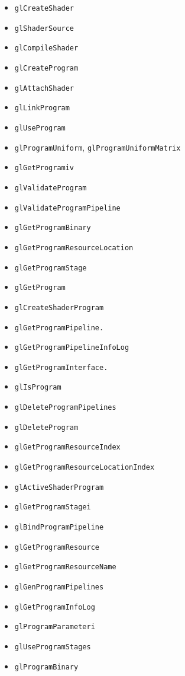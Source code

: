 \documentclass[12pt]{article}
\begin{document}
\begin{itemize}
\item \texttt{glCreateShader}
\item \texttt{glShaderSource}
\item \texttt{glCompileShader}
\item \texttt{glCreateProgram}
\item \texttt{glAttachShader}
\item \texttt{glLinkProgram}
\item \texttt{glUseProgram}
\item \texttt{glProgramUniform}, \texttt{glProgramUniformMatrix}
\item \texttt{glGetProgramiv}
\item \texttt{glValidateProgram}
\item \texttt{glValidateProgramPipeline}
\item \texttt{glGetProgramBinary}
\item \texttt{glGetProgramResourceLocation}
\item \texttt{glGetProgramStage}
\item \texttt{glGetProgram}
\item \texttt{glCreateShaderProgram}
\item \texttt{glGetProgramPipeline.}
\item \texttt{glGetProgramPipelineInfoLog}
\item \texttt{glGetProgramInterface.}
\item \texttt{glIsProgram}
\item \texttt{glDeleteProgramPipelines}
\item \texttt{glDeleteProgram}
\item \texttt{glGetProgramResourceIndex}
\item \texttt{glGetProgramResourceLocationIndex}
\item \texttt{glActiveShaderProgram}
\item \texttt{glGetProgramStagei}
\item \texttt{glBindProgramPipeline}
\item \texttt{glGetProgramResource}
\item \texttt{glGetProgramResourceName}
\item \texttt{glGenProgramPipelines}
\item \texttt{glGetProgramInfoLog}
\item \texttt{glProgramParameteri}
\item \texttt{glUseProgramStages}
\item \texttt{glProgramBinary}

\end{itemize}
\end{document}
